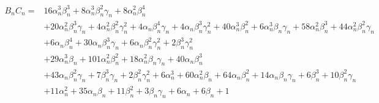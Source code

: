 \begin{align*}
B_nC_n =& 16 \alpha_n^{3} \beta_n^{3} + 8 \alpha_n^{3} \beta_n^{2} \gamma_n + 8 \alpha_n^{2} \beta_n^{4} \\
&+ 20 \alpha_n^{2} \beta_n^{3} \gamma_n + 4 \alpha_n^{2} \beta_n^{2} \gamma_n^{2} + 4 \alpha_n \beta_n^{4} \gamma_n + 4 \alpha_n \beta_n^{3} \gamma_n^{2} + 40 \alpha_n^{3} \beta_n^{2} + 6 \alpha_n^{3} \beta_n \gamma_n + 58 \alpha_n^{2} \beta_n^{3} + 44 \alpha_n^{2} \beta_n^{2} \gamma_n\\
&+ 6 \alpha_n \beta_n^{4} + 30 \alpha_n \beta_n^{3} \gamma_n + 6 \alpha_n \beta_n^{2} \gamma_n^{2} + 2 \beta_n^{3} \gamma_n^{2} \\
&+ 29 \alpha_n^{3} \beta_n + 101 \alpha_n^{2} \beta_n^{2} + 18 \alpha_n^{2} \beta_n \gamma_n + 40 \alpha_n \beta_n^{3} \\
&+ 43 \alpha_n \beta_n^{2} \gamma_n + 7 \beta_n^{3} \gamma_n + 2 \beta_n^{2} \gamma_n^{2} + 6 \alpha_n^{3} + 60 \alpha_n^{2} \beta_n + 64 \alpha_n \beta_n^{2} + 14 \alpha_n \beta_n \gamma_n + 6 \beta_n^{3} + 10 \beta_n^{2} \gamma_n \\
&+ 11 \alpha_n^{2} + 35 \alpha_n \beta_n + 11 \beta_n^{2} + 3 \beta_n \gamma_n + 6 \alpha_n + 6 \beta_n + 1
\end{align*}


